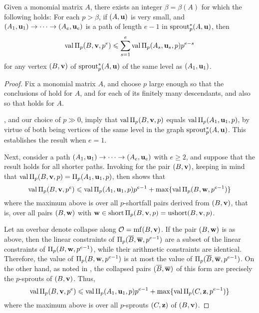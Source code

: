 \documentclass[11pt]{amsart}
\newcommand{\short}{\operatorname{short}}
\newcommand{\ushort}{\operatorname{ushort}}
\begin{document}
\begin{lemma}\label{lem: upper bound for higher mu}
   Given a monomial matrix $A$, there exists an integer $\beta= \beta(A)$ for which the following holds\textup:
   For each $p>\beta$, if $(A, \mathbf{u})$ is very small, and $(A_1, \mathbf{u}_1) \to \cdots \to (A_e, \mathbf{u}_e)$ is a path of length $e-1$ in $\operatorname{sprout}^{\ast}_p(A,\mathbf{u})$,  then
   \[
      \operatorname{val} \Pi_p(B, \mathbf{v}, p^e) \leqslant \sum_{s=1}^e \operatorname{val} \Pi_p(A_s, \mathbf{u}_s, p)p^{e-s}
   \]
   for any vertex $(B, \mathbf{v})$ of $\operatorname{sprout}^{\ast}_p(A,\mathbf{u})$ of the same level as $(A_1, \mathbf{u}_1)$.
\end{lemma}

\begin{proof}
   Fix a monomial matrix $A$, and choose $p$ large enough so that the conclusions of  hold for $A$, and for each of its finitely many descendants, and also so that  holds for $A$.  
   
   , and our choice of $p \gg 0$, imply that $\operatorname{val} \Pi_p(B,\mathbf{v},p)$ equals $\operatorname{val} \Pi_p(A_1, \mathbf{u}_1, p)$, by virtue  of both being vertices of the same level in the graph $\operatorname{sprout}_p^{\ast}(A, \mathbf{u})$.  This establishes the result when $e = 1$.
   
    Next, consider a path $(A_1,\mathbf{u}_1) \to \cdots \to (A_e, \mathbf{u}_e)$ with $e \geq 2$, and suppose that the result holds for all shorter paths.  Invoking  for the pair $(B,\mathbf{v})$, keeping in mind that  $\operatorname{val} \Pi_p(B,\mathbf{v},p) =  \Pi_p(A_1,\mathbf{u}_1,p)$, then shows that
    \[
      \operatorname{val} \Pi_p(B,\mathbf{v},p^e) \leqslant \operatorname{val} \Pi_p(A_1,\mathbf{u}_1,p) p^{e-1} + \max \{ \operatorname{val} \Pi_p (B,\mathbf{w},p^{e-1}) \} \\
    \]
    where the maximum above is over all $p$-shortfall pairs derived from $(B,\mathbf{v})$, that is, over all pairs $(B,\mathbf{w})$ with $\vv{w} \in \short \IP_p(B,\vv{v},p) = \ushort(B,\vv{v},p)$.  
    
    Let an overbar denote collapse along $\mathcal{O}=\operatorname{mf}(B,\mathbf{v})$.  If the pair $(B,\mathbf{w})$ is as above, then the linear constraints of $\Pi_p(\overline{B}, \overline{\mathbf{w}}, p^{e-1})$ are a subset of the linear constraints of $\Pi_p(B, \mathbf{w}, p^{e-1})$, while their arithmetic constraints are identical.  Therefore, the value of $\Pi_p(B,\mathbf{w},p^{e-1})$ is at most the value of $\Pi_p(\overline{B}, \overline{\mathbf{w}}, p^{e-1})$.  On the other hand, as noted in , the collapsed pairs $(\overline{B}, \overline{\mathbf{w}})$ of this form are precisely the $p$-sprouts of $(B,\mathbf{v})$.   Thus, 
    \[
      \operatorname{val} \Pi_p(B,\mathbf{v},p^e) \leqslant \operatorname{val} \Pi_p(A_1,\mathbf{u}_1,p) p^{e-1} + \max \{ \operatorname{val} \Pi_p (C,\mathbf{z},p^{e-1}) \} \\
    \]
where the maximum above is over all $p$-sprouts $(C,\mathbf{z})$ of $(B,\mathbf{v})$.  


\end{proof}
\end{document}
